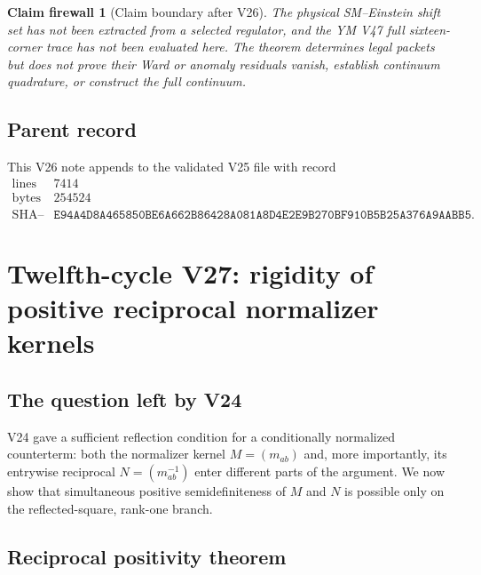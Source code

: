 \documentclass[11pt]{article}
\newtheorem{firewall}[theorem]{Claim firewall}
\theoremstyle{remark}
\begin{document}
\begin{firewall}[Claim boundary after V26]
\label{fire:v12v26-claim}
The physical SM--Einstein shift set has not been extracted from a
selected regulator, and the YM V47 full sixteen-corner trace has not
been evaluated here.  The theorem determines legal packets but does
not prove their Ward or anomaly residuals vanish, establish continuum
quadrature, or construct the full continuum.
\end{firewall}

\subsection{Parent record}

This V26 note appends to the validated V25 file with record
\[
\begin{array}{c|c}
\text{lines}&7414\\
\text{bytes}&254524\\
\text{SHA--256}&
\texttt{E94A4D8A465850BE6A662B86428A081A8D4E2E9B270BF910B5B25A376A9AABB5}.
\end{array}
\]


\section{Twelfth-cycle V27: rigidity of positive reciprocal
normalizer kernels}
\label{sec:v12v27}

\subsection{The question left by V24}

V24 gave a sufficient reflection condition for a conditionally
normalized counterterm: both the normalizer kernel
\(M=(m_{ab})\) and, more importantly, its entrywise reciprocal
\(N=(m_{ab}^{-1})\) enter different parts of the argument.  We now
show that simultaneous positive semidefiniteness of \(M\) and \(N\)
is possible only on the reflected-square, rank-one branch.

\subsection{Reciprocal positivity theorem}
\end{document}
